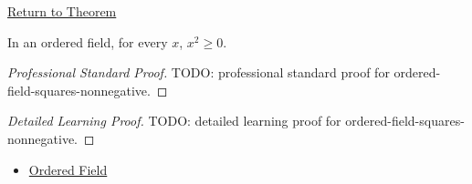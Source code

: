 \newpage
{}
\label{prf:ordered-field-squares-nonnegative}

\begin{remark*}[Return]
\hyperref[thm:ordered-field-squares-nonnegative]{Return to Theorem}
\end{remark*}

\begin{theorem*}
In an ordered field, for every $x$, $x^2\ge 0$.
\end{theorem*}

\begin{proof}[Professional Standard Proof]
\LRAProofBodyStart
TODO: professional standard proof for ordered-field-squares-nonnegative.
\end{proof}

\begin{proof}[Detailed Learning Proof]
\LRAProofBodyStart
TODO: detailed learning proof for ordered-field-squares-nonnegative.
\end{proof}

\begin{remark*}
\end{remark*}

\begin{dependencies}
\begin{itemize}
  \item \hyperref[def:ordered-field]{Ordered Field}
\end{itemize}
\end{dependencies}

\clearpage
